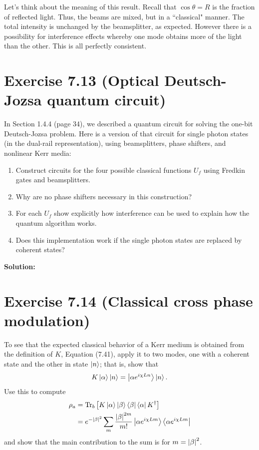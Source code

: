 \documentclass{book}
\begin{document}
    Let's think about the meaning of this result. Recall that $\cos\theta = R$ is the fraction of reflected light. Thus, the beams are mixed, but in a ``classical" manner. The total intensity is unchanged by the beamsplitter, as expected. However there is a possibility for interference effects whereby one mode obtains more of the light than the other. This is all perfectly consistent. 

\section*{Exercise 7.13 (Optical Deutsch-Jozsa quantum circuit)}
    In Section 1.4.4 (page 34), we described a quantum circuit for solving the one-bit Deutsch-Jozsa problem. Here is a version of that circuit for single photon states (in the dual-rail representation), using beamsplitters, phase shifters, and nonlinear Kerr media:

    \begin{enumerate}
        \item Construct circuits for the four possible classical functions $U_f$ using Fredkin gates and beamsplitters.
        \item Why are no phase shifters necessary in this construction?
        \item For each $U_f$ show explicitly how interference can be used to explain how the quantum algorithm works.
        \item Does this implementation work if the single photon states are replaced by coherent states?
    \end{enumerate}

    \textbf{Solution:}

\section*{Exercise 7.14 (Classical cross phase modulation)}
    To see that the expected classical behavior of a Kerr medium is obtained from the definition of $K$, Equation (7.41), apply it to two modes, one with a coherent state and the other in state $\ket{n}$; that is, show that
    \begin{align}
        K\ket{\alpha}\ket{n} = \ket{\alpha e^{i\chi L n}} \ket{n}.
    \end{align}
    Use this to compute
    \begin{align}
        \rho_a &= \Tr_b \left[K\ket{\alpha}\ket{\beta}\bra{\beta}\bra{\alpha}K^\dagger\right] \\
        &= e^{-\abs{\beta}^2} \sum_{m} \frac{\abs{\beta}^{2m}}{m!} \ket{\alpha e^{i\chi Lm}}\bra{\alpha e^{i\chi Lm}}
    \end{align}
    and show that the main contribution to the sum is for $m = \abs{\beta}^2$.
\end{document}
